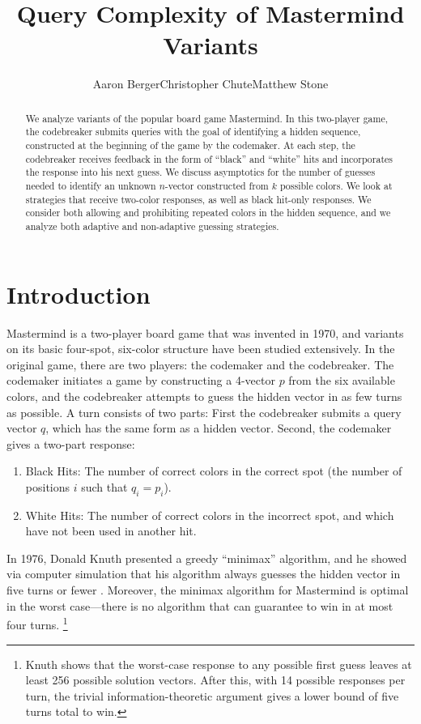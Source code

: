 \documentclass[12pt, a4paper]{article}
\author{Aaron Berger\qquad Christopher Chute\qquad Matthew Stone}
\title{Query Complexity of Mastermind Variants}
\begin{document}
\maketitle

\begin{abstract}
We analyze variants of the popular board game Mastermind. In this two-player game,
the codebreaker submits queries with the goal of identifying a hidden
sequence, constructed at the beginning of the game by the codemaker. At each step,
the codebreaker receives feedback in the form of ``black'' and ``white'' hits
and incorporates the response into his next guess. We discuss asymptotics for the
number of guesses needed to identify an unknown $n$-vector constructed from $k$
possible colors. We look at strategies that receive two-color responses, as well as
black hit-only responses. We consider both allowing and prohibiting repeated
colors in the hidden sequence, and we analyze both adaptive and non-adaptive guessing
strategies.
\end{abstract}

\section{Introduction}
Mastermind is a two-player board game that was invented in 1970, and variants on its
basic four-spot, six-color structure have been studied extensively.
In the original game, there are two players: the codemaker and the codebreaker.
The codemaker initiates a game by constructing a 4-vector $p$ from the six available
colors, and the codebreaker attempts to guess the hidden vector in as few turns as
possible. A turn consists of two parts: First the codebreaker submits a query vector
$q$, which has the same form as a hidden vector. Second, the codemaker gives a
two-part response:
	\begin{enumerate}[label=\arabic*.]
	\item Black Hits: The number of correct colors in the correct spot
	(the number of positions $i$ such that $q_i=p_i$).
	\item White Hits: The number of correct colors in the incorrect spot, and which
	have not been used in another hit.
	\end{enumerate}
In 1976, Donald Knuth presented a greedy ``minimax'' algorithm, and he showed via
computer simulation that his algorithm always guesses the hidden vector in five turns
or fewer \cite{DK76}. Moreover, the minimax algorithm for Mastermind is optimal in
the worst case---there is no algorithm that can guarantee to win in at most four turns.
\footnote{Knuth shows that the worst-case response to any possible first guess leaves
at least 256 possible solution vectors. After this, with 14 possible responses per turn,
the trivial information-theoretic argument gives a lower bound of five turns total to win.}
\end{document}
